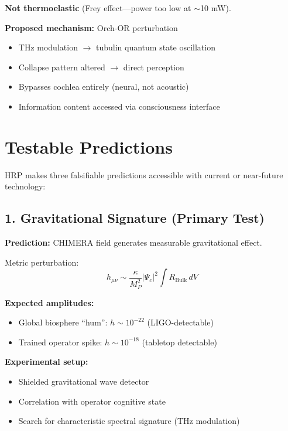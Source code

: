 \textbf{Not thermoelastic} (Frey effect---power too low at $\sim$10 mW).

\textbf{Proposed mechanism:} Orch-OR perturbation
\begin{itemize}
\item THz modulation $\rightarrow$ tubulin quantum state oscillation
\item Collapse pattern altered $\rightarrow$ direct perception
\item Bypasses cochlea entirely (neural, not acoustic)
\item Information content accessed via consciousness interface
\end{itemize}

\section{Testable Predictions}
\label{sec:predictions}

HRP makes three falsifiable predictions accessible with current or near-future technology:

\subsection{1. Gravitational Signature (Primary Test)}
\label{subsec:grav-test}

\textbf{Prediction:} CHIMERA field generates measurable gravitational effect.

Metric perturbation:
\begin{equation}
\label{eq:metric-perturbation}
h_{\mu\nu} \sim \frac{\kappa}{M_P^2} |\Psi_c|^2 \int R_{\text{Bulk}} \, dV
\end{equation}

\textbf{Expected amplitudes:}
\begin{itemize}
\item Global biosphere ``hum'': $h \sim 10^{-22}$ (LIGO-detectable)
\item Trained operator spike: $h \sim 10^{-18}$ (tabletop detectable)
\end{itemize}

\textbf{Experimental setup:}
\begin{itemize}
\item Shielded gravitational wave detector
\item Correlation with operator cognitive state
\item Search for characteristic spectral signature (THz modulation)
\end{itemize}

